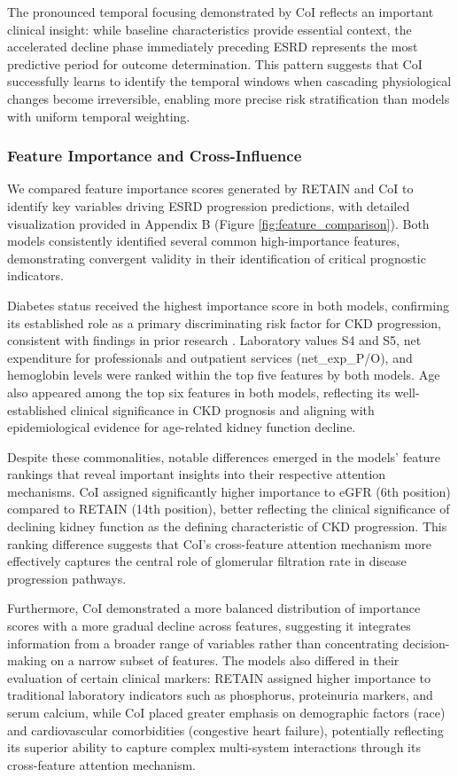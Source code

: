 \documentclass[letterpaper]{article}
\begin{document}
\begin{enumerate}
The pronounced temporal focusing demonstrated by CoI reflects an important clinical insight: while baseline characteristics provide essential context, the accelerated decline phase immediately preceding ESRD represents the most predictive period for outcome determination. This pattern suggests that CoI successfully learns to identify the temporal windows when cascading physiological changes become irreversible, enabling more precise risk stratification than models with uniform temporal weighting.

\subsubsection{Feature Importance and Cross-Influence}

We compared feature importance scores generated by RETAIN and CoI to identify key variables driving ESRD progression predictions, with detailed visualization provided in Appendix B (Figure \ref{fig:feature_comparison}). Both models consistently identified several common high-importance features, demonstrating convergent validity in their identification of critical prognostic indicators.

Diabetes status received the highest importance score in both models, confirming its established role as a primary discriminating risk factor for CKD progression, consistent with findings in prior research \cite{burckhardt2017multi}. Laboratory values S4 and S5, net expenditure for professionals and outpatient services (net\_exp\_P/O), and hemoglobin levels were ranked within the top five features by both models. Age also appeared among the top six features in both models, reflecting its well-established clinical significance in CKD prognosis and aligning with epidemiological evidence for age-related kidney function decline.

Despite these commonalities, notable differences emerged in the models' feature rankings that reveal important insights into their respective attention mechanisms. CoI assigned significantly higher importance to eGFR (6th position) compared to RETAIN (14th position), better reflecting the clinical significance of declining kidney function as the defining characteristic of CKD progression. This ranking difference suggests that CoI's cross-feature attention mechanism more effectively captures the central role of glomerular filtration rate in disease progression pathways.

Furthermore, CoI demonstrated a more balanced distribution of importance scores with a more gradual decline across features, suggesting it integrates information from a broader range of variables rather than concentrating decision-making on a narrow subset of features. The models also differed in their evaluation of certain clinical markers: RETAIN assigned higher importance to traditional laboratory indicators such as phosphorus, proteinuria markers, and serum calcium, while CoI placed greater emphasis on demographic factors (race) and cardiovascular comorbidities (congestive heart failure), potentially reflecting its superior ability to capture complex multi-system interactions through its cross-feature attention mechanism.


\end{enumerate}
\end{document}

